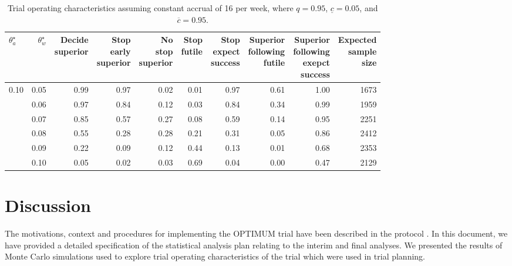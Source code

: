 \documentclass{bmcart}
\begin{document}
\begin{table}[!ht]
	\footnotesize
	\caption{\label{tab:oc1}Trial operating characteristics assuming constant accrual of 16 per week, where $q=0.95$, $\underline{c}=0.05$, and $\overline{c}=0.95$.}
	\centering
	\begin{tabular}[t]{lrrrrrrrrr}
	\toprule
	$\theta_a^\star$ & $\theta_w^\star$ & \makecell{Decide\\superior} & \makecell{Stop\\early\\superior} & \makecell{No\\stop\\superior} & \makecell{Stop\\futile} & \makecell{Stop\\expect\\success} & \makecell{Superior\\following\\futile} & \makecell{Superior\\following\\exepct\\success} & \makecell{Expected\\sample\\size}\\
	\midrule
	0.10 & 0.05 & 0.99 & 0.97 & 0.02 & 0.01 & 0.97 & 0.61 & 1.00 & 1673\\
	 & 0.06 & 0.97 & 0.84 & 0.12 & 0.03 & 0.84 & 0.34 & 0.99 & 1959\\
	 & 0.07 & 0.85 & 0.57 & 0.27 & 0.08 & 0.59 & 0.14 & 0.95 & 2251\\
	 & 0.08 & 0.55 & 0.28 & 0.28 & 0.21 & 0.31 & 0.05 & 0.86 & 2412\\
	 & 0.09 & 0.22 & 0.09 & 0.12 & 0.44 & 0.13 & 0.01 & 0.68 & 2353\\
	 & 0.10 & 0.05 & 0.02 & 0.03 & 0.69 & 0.04 & 0.00 & 0.47 & 2129\\
	\bottomrule
	\end{tabular}
\end{table}



\section*{Discussion}

The motivations, context and procedures for implementing the OPTIMUM trial have been described in the protocol \citep{perez2020}. 
In this document, we have provided a detailed specification of the statistical analysis plan relating to the interim and final analyses. 
We presented the results of Monte Carlo simulations used to explore trial operating characteristics of the trial which were used in trial planning.
\end{document}
